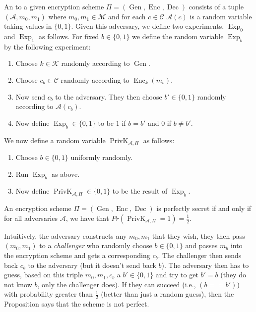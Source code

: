 \documentclass[twoside, a4paper, 10pt]{amsart}
\begin{document}
\begin{mydef}[Adversary] \label{def: adversary} An  to a given encryption scheme $\Pi = (\operatorname{Gen}, \operatorname{Enc}, \operatorname{Dec})$ consists of a tuple $(\mathcal{A}, m_0, m_1)$ where $m_0,m_1 \in \mathcal{M}$ and for each $c \in \mathcal{C}$ $\mathcal{A}(c)$ is a random variable taking values in $\{0,1\}$. Given this adversary, we define two experiments, $\operatorname{Exp}_0$ and $\operatorname{Exp}_1$ as follows. For fixed $b \in \{0,1\}$ we define the random variable $\operatorname{Exp}_b$ by the following experiment:

\begin{enumerate}
	\item Choose $k \in \mathcal{K}$ randomly according to $\operatorname{Gen}$.
	\item Choose $c_b \in \mathcal{C}$ randomly according to $\operatorname{Enc}_k(m_b)$.
	\item Now send $c_b$ to the adversary. They then choose $b' \in \{0,1\}$ randomly according to $\mathcal{A}(c_b)$.
	\item Now define $\operatorname{Exp}_b \in \{0,1\}$ to be $1$ if $b = b'$ and $0$ if $b \neq b'$.
\end{enumerate}

We now define a random variable $\operatorname{PrivK}_{\mathcal{A}, \Pi}$ as follows:

\begin{enumerate}
	\item Choose $b \in \{0,1\}$ uniformly randomly.
	\item Run $\operatorname{Exp}_b$ as above.
	\item Now define $\operatorname{PrivK}_{\mathcal{A}, \Pi} \in \{0,1\}$ to be the result of $\operatorname{Exp}_b$.

\end{enumerate}

\end{mydef}

\begin{prop} An encryption scheme $\Pi = (\operatorname{Gen}, \operatorname{Enc}, \operatorname{Dec})$ is perfectly secret if and only if for all adversaries $\mathcal{A}$, we have that $Pr(\operatorname{PrivK}_{\mathcal{A}, \Pi} = 1) = \frac{1}{2}. $

\end{prop}

Intuitively, the adversary constructs any $m_0,m_1$ that they wish, they then pass $(m_0,m_1)$ to a \textit{challenger} who randomly choose $b \in \{0,1\}$ and passes $m_b$ into the encryption scheme and gets a corresponding $c_b$. The challenger then sends back $c_b$ to the adversary (but it doesn't send back $b$). The adversary then has to guess, based on this triple $m_0, m_1, c_b$ a $b' \in \{0,1\}$ and try to get $b' = b$ (they do not know $b$, only the challenger does). If they can succeed (i.e., $(b == b')$) with probability greater than $\frac{1}{2}$ (better than just a random guess), then the Proposition says that the scheme is not perfect.
\end{document}
